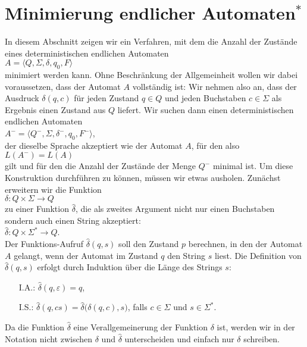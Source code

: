 \chapter[Minimierung von FSMs$^*$]{Minimierung endlicher Automaten$^*$}
In diesem Abschnitt zeigen wir ein Verfahren, mit dem die Anzahl der Zust\"ande eines deterministischen
endlichen Automaten 
\\[0.2cm]
\hspace*{1.3cm}
$A = \langle Q, \Sigma, \delta, q_0, F \rangle$
\\[0.2cm]
minimiert werden kann.  Ohne Beschr\"ankung der Allgemeinheit wollen wir dabei voraussetzen,
dass der Automat $A$ vollst\"andig ist: Wir nehmen also an, dass der Ausdruck $\delta(q, c)$
f\"ur jeden Zustand $q \in Q$ und jeden Buchstaben $c \in \Sigma$ als Ergebnis einen Zustand
aus $Q$ liefert. Wir suchen dann einen deterministischen
endlichen Automaten 
\\[0.2cm]
\hspace*{1.3cm}
$A^- = \langle Q^-, \Sigma, \delta^-, q_0, F^- \rangle$,
\\[0.2cm]
der dieselbe Sprache akzeptiert wie der Automat $A$, f\"ur den also
\\[0.2cm]
\hspace*{1.3cm}
$L(A^-) = L(A)$
\\[0.2cm]
gilt und f\"ur den die Anzahl der Zust\"ande der Menge $Q^-$ minimal ist.  
Um diese
Konstruktion durchf\"uhren zu k\"onnen, m\"ussen wir etwas ausholen.
Zun\"achst erweitern wir die Funktion 
\\[0.2cm]
\hspace*{1.3cm}
$\delta: Q \times \Sigma \rightarrow Q$
\\[0.2cm]
zu einer Funktion $\hat{\delta}$, die als zweites Argument nicht nur einen Buchstaben
sondern auch einen String akzeptiert:
\\[0.2cm]
\hspace*{1.3cm}
$\hat{\delta} : Q \times \Sigma^* \rightarrow Q$.
\\[0.2cm]
Der Funktions-Aufruf $\hat{\delta}(q,s)$ soll den Zustand $p$ berechnen, in den der Automat $A$ gelangt,
wenn der Automat im Zustand $q$ den String $s$ liest.
Die Definition von $\hat{\delta}(q,s)$ erfolgt durch Induktion \"uber die L\"ange des Strings $s$:
\begin{enumerate}
\item[I.A.:] $\hat{\delta}(q,\varepsilon) = q$,
\item[I.S.:] $\hat{\delta}(q,cs) = \hat{\delta}\bigl(\delta(q,c),s\bigr)$, 
             falls $c \in   \Sigma$ und $s \in \Sigma^*$.
\end{enumerate}
Da die Funktion $\hat{\delta}$ eine Verallgemeinerung der Funktion $\delta$ ist, werden wir in der
Notation nicht zwischen $\delta$ und $\hat{\delta}$ unterscheiden und einfach nur $\delta$ schreiben.

